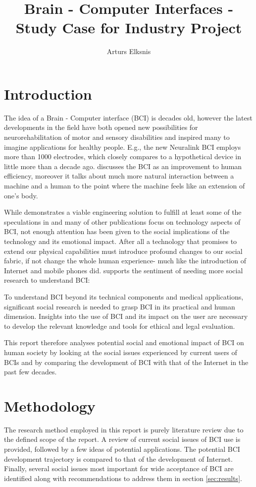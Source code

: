 \documentclass[fleqn,11pt]{olplainarticle}
\title{Brain - Computer Interfaces - Study Case for Industry Project}
\author[1]{Arturs Elksnis}
\begin{document}
\flushbottom
\maketitle
\thispagestyle{empty}

\section{Introduction}
The idea of a Brain - Computer interface (BCI) is decades old, however the latest developments in the field have both opened new possibilities for neurorehabilitation of motor and sensory disabilities and inspired many to imagine applications for healthy people. E.g., the new Neuralink BCI \cite{musk2019integrated} employs more than 1000 electrodes, which closely compares to a hypothetical device in \cite{schalk2008brain} little more than a decade ago. \cite{schalk2008brain} discusses the BCI as an improvement to human efficiency, moreover it talks about much more natural interaction between a machine and a human to the point where the machine feels like an extension of one's body.

While \cite{musk2019integrated} demonstrates a viable engineering solution to fulfill at least some of the speculations in \cite{schalk2008brain} and many of other publications focus on technology aspects of BCI, not enough attention has been given to the social implications of the technology and its emotional impact. After all a technology that promises to extend our physical capabilities must introduce profound changes to our social fabric, if not change the whole human experience- much like the introduction of Internet and mobile phones did. \cite{kogel2019using} supports the sentiment of needing more social research 
to understand BCI:
\begin{displayquote}
    To understand BCI beyond its technical components and medical applications, significant social research is needed to grasp BCI in its practical and human dimension. Insights into the use of BCI and its impact on the user are necessary to develop the relevant knowledge and tools for ethical and legal evaluation.
\end{displayquote}

This report therefore analyses potential social and emotional impact of BCI on human society by looking at the social issues experienced by current users of BCIs and by comparing the development of BCI with that of the Internet in the past few decades.

\section{Methodology}
The research method employed in this report is purely literature review due to the defined scope of the report. A review of current social issues of BCI use is provided, followed by a few ideas of potential applications. The potential BCI development trajectory is compared to that of the development of Internet. Finally, several social issues most important for wide acceptance of BCI are identified along with recommendations to address them in section \ref{sec:results}.
\end{document}
